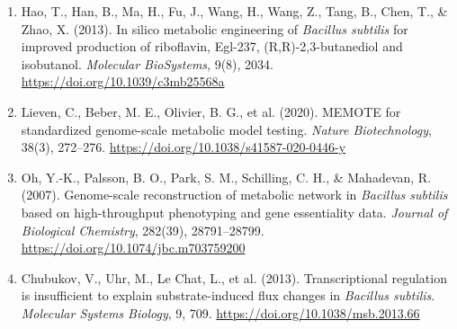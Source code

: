\documentclass[12pt,a4paper]{article}
\begin{document}
\begin{enumerate}[leftmargin=*]
\item Hao, T., Han, B., Ma, H., Fu, J., Wang, H., Wang, Z., Tang, B., Chen, T., \& Zhao, X. (2013). In silico metabolic engineering of \textit{Bacillus subtilis} for improved production of riboflavin, Egl-237, (R,R)-2,3-butanediol and isobutanol. \textit{Molecular BioSystems}, 9(8), 2034. \url{https://doi.org/10.1039/c3mb25568a}
\item Lieven, C., Beber, M. E., Olivier, B. G., et al. (2020). MEMOTE for standardized genome-scale metabolic model testing. \textit{Nature Biotechnology}, 38(3), 272--276. \url{https://doi.org/10.1038/s41587-020-0446-y}
\item Oh, Y.-K., Palsson, B. O., Park, S. M., Schilling, C. H., \& Mahadevan, R. (2007). Genome-scale reconstruction of metabolic network in \textit{Bacillus subtilis} based on high-throughput phenotyping and gene essentiality data. \textit{Journal of Biological Chemistry}, 282(39), 28791--28799. \url{https://doi.org/10.1074/jbc.m703759200}
\item Chubukov, V., Uhr, M., Le Chat, L., et al. (2013). Transcriptional regulation is insufficient to explain substrate-induced flux changes in \textit{Bacillus subtilis}. \textit{Molecular Systems Biology}, 9, 709. \url{https://doi.org/10.1038/msb.2013.66}
\end{enumerate}
\end{document}
